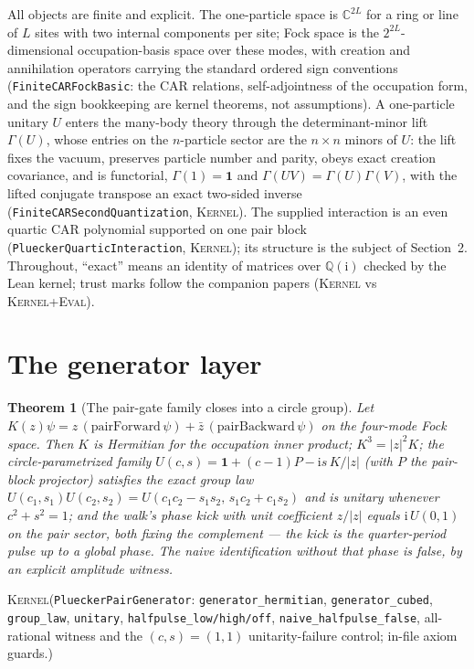 \documentclass[11pt]{article}
\newcommand{\ii}{\mathrm{i}}
\newcommand{\id}{\mathbf{1}}
\newcommand{\C}{\mathbb{C}}
\newcommand{\Kernel}{\textcolor{kernelcolor}{\textsc{Kernel}}}
\newcommand{\DraftTrust}{\textcolor{draftcolor}{\textsc{Kernel+Eval}}}
\newtheorem{theorem}{Theorem}
\begin{document}
All objects are finite and explicit.  The one-particle space is
$\C^{2L}$ for a ring or line of $L$ sites with two internal components
per site; Fock space is the $2^{2L}$-dimensional occupation-basis space
over these modes, with creation and annihilation operators carrying the
standard ordered sign conventions (\texttt{FiniteCARFockBasic}: the CAR
relations, self-adjointness of the occupation form, and the sign
bookkeeping are kernel theorems, not assumptions).  A one-particle
unitary $U$ enters the many-body theory through the determinant-minor
lift $\Gamma(U)$, whose entries on the $n$-particle sector are the
$n\times n$ minors of $U$: the lift fixes the vacuum, preserves particle
number and parity, obeys exact creation covariance, and is functorial,
$\Gamma(1)=\id$ and $\Gamma(UV)=\Gamma(U)\Gamma(V)$, with the lifted
conjugate transpose an exact two-sided inverse
(\texttt{FiniteCARSecondQuantization}, \Kernel{}).  The supplied
interaction is an even quartic CAR polynomial supported on one pair
block (\texttt{PlueckerQuarticInteraction}, \Kernel{}); its structure is
the subject of Section~2.  Throughout, ``exact'' means an identity of
matrices over $\mathbb{Q}(\ii)$ checked by the Lean kernel; trust marks
follow the companion papers (\Kernel{} vs \DraftTrust{}).

\section{The generator layer}

\begin{theorem}[The pair-gate family closes into a circle group]\label{thm:gen}
Let $K(z)\psi = z\,(\text{pairForward}\,\psi) +
\bar z\,(\text{pairBackward}\,\psi)$ on the four-mode Fock space.  Then
$K$ is Hermitian for the occupation inner product; $K^3=|z|^2K$; the
circle-parametrized family
$U(c,s)=\id+(c-1)P-\ii s\,K/|z|$ (with $P$ the pair-block projector)
satisfies the exact group law
$U(c_1,s_1)U(c_2,s_2)=U(c_1c_2-s_1s_2,\,s_1c_2+c_1s_2)$ and is unitary
whenever $c^2+s^2=1$; and the walk's phase kick with unit coefficient
$z/|z|$ equals $\ii\,U(0,1)$ on the pair sector, both fixing the
complement --- the kick is the quarter-period pulse up to a global
phase.  The naive identification without that phase is false, by an
explicit amplitude witness.
\end{theorem}
\noindent\Kernel{}\quad(\texttt{PlueckerPairGenerator}:
\texttt{generator\_hermitian}, \texttt{generator\_cubed},
\texttt{group\_law}, \texttt{unitary}, \texttt{halfpulse\_low/high/off},
\texttt{naive\_halfpulse\_false}, all-rational witness and the
$(c,s)=(1,1)$ unitarity-failure control; in-file axiom guards.)
\end{document}
